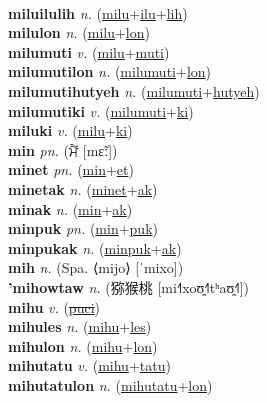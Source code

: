  \label{milu} \\
\textbf{miluilulih} \textit{n.} (\hyperref[milu]{milu}+\hyperref[ilu]{ilu}+\hyperref[lih]{lih})
 \label{miluilulih} \\
\textbf{milulon} \textit{n.} (\hyperref[milu]{milu}+\hyperref[lon]{lon})
 \label{milulon} \\
\textbf{milumuti} \textit{v.} (\hyperref[milu]{milu}+\hyperref[muti]{muti})
 \label{milumuti} \\
\textbf{milumutilon} \textit{n.} (\hyperref[milumuti]{milumuti}+\hyperref[lon]{lon})
 \label{milumutilon} \\
\textbf{milumutihutyeh} \textit{n.} (\hyperref[milumuti]{milumuti}+\hyperref[hutyeh]{hutyeh})
 \label{milumutihutyeh} \\
\textbf{milumutiki} \textit{v.} (\hyperref[milumuti]{milumuti}+\hyperref[ki]{ki})
 \label{milumutiki} \\
\textbf{miluki} \textit{v.} (\hyperref[milu]{milu}+\hyperref[ki]{ki})
 \label{miluki} \\
\textbf{min} \textit{pn.} ({\gurmukhi{}ਮੈਂ} [mɛ̃ː])
 \label{min} \\
\textbf{minet} \textit{pn.} (\hyperref[min]{min}+\hyperref[et]{et})
 \label{minet} \\
\textbf{minetak} \textit{n.} (\hyperref[minet]{minet}+\hyperref[ak]{ak})
 \label{minetak} \\
\textbf{minak} \textit{n.} (\hyperref[min]{min}+\hyperref[ak]{ak})
 \label{minak} \\
\textbf{minpuk} \textit{pn.} (\hyperref[min]{min}+\hyperref[puk]{puk})
 \label{minpuk} \\
\textbf{minpukak} \textit{n.} (\hyperref[minpuk]{minpuk}+\hyperref[ak]{ak})
 \label{minpukak} \\
\textbf{mih} \textit{n.} (Spa. ⟨mijo⟩ [ˈmixo])
 \label{mih} \\
\textbf{'mihowtaw} \textit{n.} ({\chinese{}猕猴桃} [mi˧˥xoʊ̯˧˥tʰaʊ̯˧˥])
 \label{'mihowtaw} \\
\textbf{mihu} \textit{v.} (\hyperref[puci]{\sout{puci}})
 \label{mihu} \\
\textbf{mihules} \textit{n.} (\hyperref[mihu]{mihu}+\hyperref[les]{les})
 \label{mihules} \\
\textbf{mihulon} \textit{n.} (\hyperref[mihu]{mihu}+\hyperref[lon]{lon})
 \label{mihulon} \\
\textbf{mihutatu} \textit{v.} (\hyperref[mihu]{mihu}+\hyperref[tatu]{tatu})
 \label{mihutatu} \\
\textbf{mihutatulon} \textit{n.} (\hyperref[mihutatu]{mihutatu}+\hyperref[lon]{lon})
